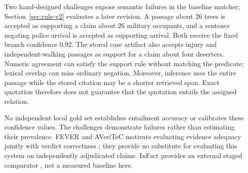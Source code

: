 Two hand-designed challenges expose semantic failures in the baseline matcher; Section~\ref{sec:rule-v2} evaluates a later revision.
A passage about 26 trees is accepted as supporting a claim about 26 military
occupants, and a sentence negating police arrival is accepted as supporting
arrival. Both receive the fixed branch confidence 0.92. The stored case artifact
also accepts injury and independent-walking passages as support for a claim about
four deserters. Numeric agreement can satisfy the support rule without matching
the predicate; lexical overlap can miss ordinary negation. Moreover, inference
uses the entire passage while the stored citation may be a shorter retrieved
span. Exact quotation therefore does not guarantee that the quotation entails
the assigned relation.

No independent local gold set establishes entailment accuracy or calibrates these
confidence values. The challenges demonstrate failures rather than estimating
their prevalence. FEVER and AVeriTeC motivate evaluating evidence adequacy jointly
with verdict correctness \citep{thorne2018fever,schlichtkrull2023averitec,
schlichtkrull2024averitec}; they provide no substitute for evaluating this system
on independently adjudicated claims. InFact provides an external staged comparator
\citep{rothermel2024infact}, not a measured baseline here.
